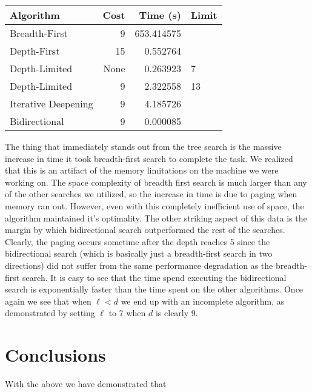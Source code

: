 \documentclass[a4paper,11pt]{report}
\begin{document}
\begin{tabular}{ | l | r | r | l | }
  \hline
  Algorithm & Cost & Time (s) & Limit \\ \hline
  Breadth-First & 9 & 653.414575 & \\
  Depth-First & 15 & 0.552764 & \\
  Depth-Limited & None & 0.263923 &  7 \\
  Depth-Limited & 9 & 2.322558 & 13 \\
  Iterative Deepening & 9 & 4.185726 & \\
  Bidirectional & 9 & 0.000085 & \\
  \hline
\end{tabular}
\vspace{5 mm}

The thing that immediately stands out from the tree search is the massive
increase in time it took breadth-first search to complete the task. We realized
that this is an artifact of the memory limitations on the machine we were
working on.  The space complexity of breadth first search is much larger than
any of the other searches we utilized, so the increase in time is due to paging
when memory ran out.  However, even with this completely inefficient use of
space, the algorithm maintained it's optimality.\newline
\indent The other striking aspect of this data is the margin by which
bidirectional search outperformed the rest of the searches. Clearly, the paging
occurs sometime after the depth reaches 5 since the bidirectional search (which
is basically just a breadth-first search in two directions) did not suffer from
the same performance degradation as the breadth-first search.  It is easy to see
that the time spend executing the bidirectional search is exponentially faster
than the time spent on the other algorithms.\newline
\indent Once again we see that when $\ell < d$ we end up with an incomplete
algorithm, as demonstrated by setting $\ell$ to 7 when $d$ is clearly 9.

\section{Conclusions}
With the above we have demonstrated that 
\end{document}
